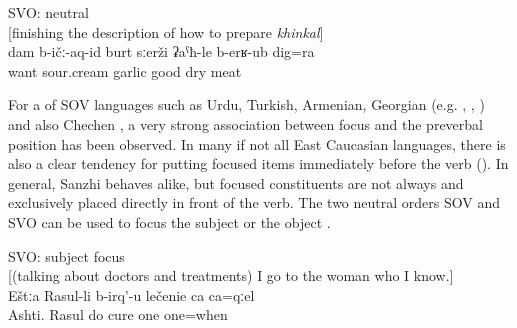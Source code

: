 \begin{exe}
	\ex	SVO: neutral \\	\label{ex:‎‎‎I like garlic, fried tomato sauce, and also well dried-meat SVO}
		[finishing the description of how to prepare \textit{khinkal}]\\
	\gll	dam	b-ičː-aq-id	burt	sːerži	ʡaˁħ-le	b-erʁ-ub	dig=ra\\
		 want sour.cream	garlic	good dry	meat\\
	\glt	{}
\end{exe}

For a  of SOV languages such as Urdu, Turkish, Armenian, Georgian (e.g. \citealt{ButtKing1996}, \citealt{Comrie1984},  \citealt{Testelec1998b}) and also Chechen \citep{Komen2007}, a very strong association between focus and the preverbal position has been observed. In many if not all East Caucasian languages, there is also a clear tendency for putting focused items immediately before the verb  (\citealt{Testelec1998a, Testelets.1998c, Forker.Belyaev2016}). In general, Sanzhi behaves alike, but focused constituents are not always and exclusively placed directly in front of the verb. The two neutral orders SOV and SVO can be used to focus the subject  or the object .

%
\begin{exe}
	\ex	SVO: subject focus\\\label{ex:‎‎In Ashti Rasul makes cures SVO}%
		[(talking about doctors and treatments) I go to the woman who I know.]\\
	\gll	Eštːa	Rasul-li	b-irq'-u	lečenie	ca	ca=qːel\\
		Ashti.	Rasul	do	cure	one	one=when\\
	\glt	{}
\end{exe}

